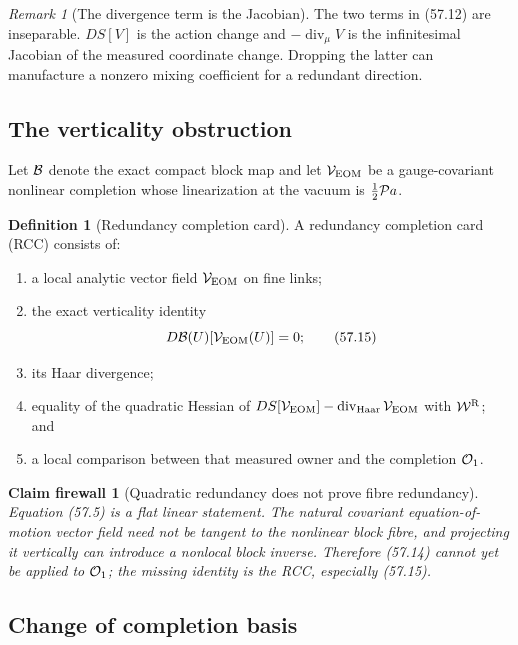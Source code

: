 \documentclass[11pt,oneside]{book}
\newtheorem{firewall}[theorem]{Claim firewall}
\theoremstyle{definition}
\newtheorem{definition}[theorem]{Definition}
\theoremstyle{remark}
\newtheorem{remark}[theorem]{Remark}
\begin{document}
\begin{remark}[The divergence term is the Jacobian]
\label{rem:e8v57-divergence-Jacobian}
The two terms in (57.12) are inseparable.  \(DS[V]\) is the action
change and \(-\operatorname{div}_\mu V\) is the infinitesimal
Jacobian of the measured coordinate change.  Dropping the latter
can manufacture a nonzero mixing coefficient for a redundant
direction.
\end{remark}

\subsection{The verticality obstruction}

Let \({\cal B}\) denote the exact compact block map and let
\({\cal V}_{\rm EOM}\) be a gauge-covariant nonlinear completion
whose linearization at the vacuum is
\(\frac12{\cal P}a\).

\begin{definition}[Redundancy completion card]
\label{def:e8v57-RCC}
A redundancy completion card (RCC) consists of:
\begin{enumerate}
\item a local analytic vector field
      \({\cal V}_{\rm EOM}\) on fine links;
\item the exact verticality identity
      \[
       D{\cal B}(U)[{\cal V}_{\rm EOM}(U)]=0;                 \tag{57.15}
      \]
\item its Haar divergence;
\item equality of the quadratic Hessian of
      \(DS[{\cal V}_{\rm EOM}]-\operatorname{div}_{\rm Haar}
       {\cal V}_{\rm EOM}\)
      with \({\cal W}^{\rm R}\); and
\item a local comparison between that measured owner and the
      completion \({\cal O}_1\).
\end{enumerate}
\end{definition}

\begin{firewall}[Quadratic redundancy does not prove fibre
redundancy]
\label{fire:e8v57-verticality}
Equation (57.5) is a flat linear statement.  The natural covariant
equation-of-motion vector field need not be tangent to the
nonlinear block fibre, and projecting it vertically can introduce
a nonlocal block inverse.  Therefore (57.14) cannot yet be applied
to \({\cal O}_1\); the missing identity is the RCC, especially
(57.15).
\end{firewall}

\subsection{Change of completion basis}
\end{document}
